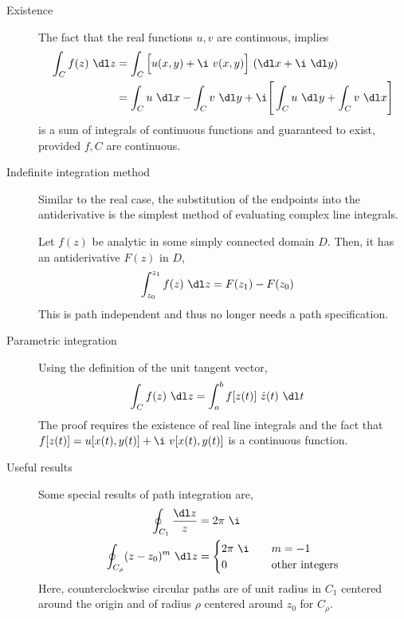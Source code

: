 \begin{description}
    \item[Existence] The fact that the real functions $ u, v $ are continuous, implies
        \begin{align}
            \int_C f(z)\ \dl z & = \int_C \Big[u(x, y) + \i\ v(x, y)\Big]\ (\dl x
            + \i\ \dl y)                                                          \\
                               & = \int_C u\ \dl x - \int_C v\ \dl y + \i \Bigg[
                \int_C u\ \dl y + \int_C v\ \dl x \Bigg]
        \end{align}
        is a sum of integrals of continuous functions and guaranteed to exist, provided
        $ f, C $ are continuous.

    \item[Indefinite integration method] Similar to the real case, the substitution of
        the endpoints into the antiderivative is the simplest method of evaluating complex
        line integrals. \par
        Let $ f(z) $ be analytic in some simply connected domain $ D $. Then, it has an
        antiderivative $ F(z) $ in $ D $,
        \begin{align}
            \int_{z_0}^{z_1} f(z)\ \dl z & = F(z_1) - F(z_0)
        \end{align}
        This is path independent and thus no longer needs a path specification.

    \item[Parametric integration] Using the definition of the unit tangent vector,
        \begin{align}
            \int_{C} f(z)\ \dl z & = \int_{a}^{b} f[z(t)]\ \dot{z}(t)\ \dl t
        \end{align}
        The proof requires the existence of real line integrals and the fact that
        $ f[z(t)] = u[x(t), y(t)] + \i\ v[x(t), y(t)] $ is a continuous function.

    \item[Useful results] Some special results of path integration are,
        \begin{align}
            \oint_{C_1} \frac{\dl z}{z}       & = 2\pi\ \i \\
            \oint_{C_\rho} (z - z_0)^m\ \dl z & =
            \begin{cases}
                2\pi\ \i & \quad m = -1                \\
                0        & \quad \text{other integers}
            \end{cases}
        \end{align}
        Here, counterclockwise circular paths are of unit radius in $ C_1 $ centered
        around the origin and of radius $ \rho $ centered around $ z_0 $ for $ C_\rho $.


\end{description}
